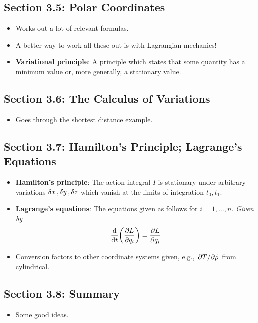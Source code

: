 \documentclass[../notes.tex]{subfiles}
\begin{document}
\subsection*{Section 3.5: Polar Coordinates}
\begin{itemize}
    \item Works out a lot of relevant formulas.
    \item A better way to work all these out is with Lagrangian mechanics!
    \item \textbf{Variational principle}: A principle which states that some quantity has a minimum value or, more generally, a stationary value.
\end{itemize}


\subsection*{Section 3.6: The Calculus of Variations}
\begin{itemize}
    \item Goes through the shortest distance example.
\end{itemize}


\subsection*{Section 3.7: Hamilton's Principle; Lagrange's Equations}
\begin{itemize}
    \item \textbf{Hamilton's principle}: The action integral $I$ is stationary under arbitrary variations $\var{x},\var{y},\var{z}$ which vanish at the limits of integration $t_0,t_1$.
    \item \textbf{Lagrange's equations}: The equations given as follows for $i=1,\dots,n$. \emph{Given by}
    \begin{equation*}
        \dv{t}(\pdv{L}{\dot{q}_i}) = \pdv{L}{q_i}
    \end{equation*}
    \item Conversion factors to other coordinate systems given, e.g., $\pdv*{T}{\dot{\rho}}$ from cylindrical.
\end{itemize}


\subsection*{Section 3.8: Summary}
\begin{itemize}
    \item Some good ideas.
\end{itemize}
\end{document}
